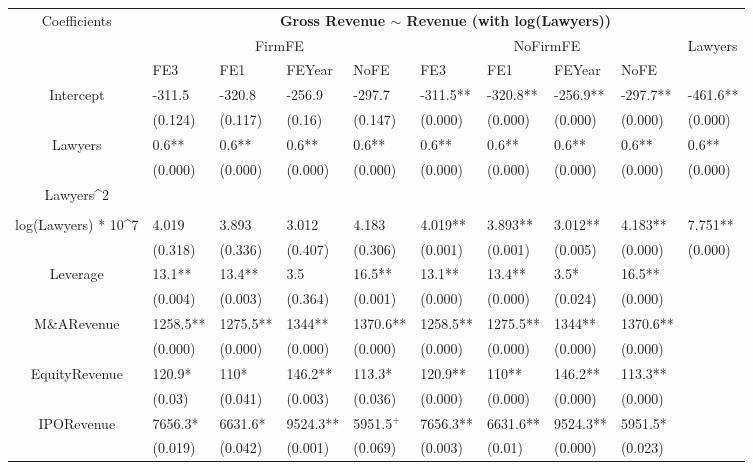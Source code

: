 \documentclass{article}
\begin{document}
\begin{table}[H]
\centering
\begin{tabular}{|clllllllll|}
\hline
\multirow{3}{*}{Coefficients} & \multicolumn{9}{c|}{\textbf{Gross Revenue $\sim$ Revenue (with log(Lawyers))}} \\
\cline{2-10}
& \multicolumn{4}{c}{FirmFE} & \multicolumn{4}{c}{NoFirmFE} & \multirow{2}{*}{Lawyers} \\
\cline{2-9}
& FE3 & FE1 & FEYear & NoFE & FE3 & FE1 & FEYear & NoFE &  \\
\hline
 
Intercept & -311.5 & -320.8 & -256.9 & -297.7 & -311.5** & -320.8** & -256.9** & -297.7** & -461.6** \\ 
   & (0.124) & (0.117) & (0.16) & (0.147) & (0.000) & (0.000) & (0.000) & (0.000) & (0.000) \\ 
  Lawyers & 0.6** & 0.6** & 0.6** & 0.6** & 0.6** & 0.6** & 0.6** & 0.6** & 0.6** \\ 
   & (0.000) & (0.000) & (0.000) & (0.000) & (0.000) & (0.000) & (0.000) & (0.000) & (0.000) \\ 
  Lawyers^2 &  &  &  &  &  &  &  &  &  \\ 
   &  &  &  &  &  &  &  &  &  \\ 
  log(Lawyers) * 10^7 & 4.019 & 3.893 & 3.012 & 4.183 & 4.019** & 3.893** & 3.012** & 4.183** & 7.751** \\ 
   & (0.318) & (0.336) & (0.407) & (0.306) & (0.001) & (0.001) & (0.005) & (0.000) & (0.000) \\ 
  Leverage & 13.1** & 13.4** & 3.5 & 16.5** & 13.1** & 13.4** & 3.5* & 16.5** &  \\ 
   & (0.004) & (0.003) & (0.364) & (0.001) & (0.000) & (0.000) & (0.024) & (0.000) &  \\ 
  M\&ARevenue & 1258.5** & 1275.5** & 1344** & 1370.6** & 1258.5** & 1275.5** & 1344** & 1370.6** &  \\ 
   & (0.000) & (0.000) & (0.000) & (0.000) & (0.000) & (0.000) & (0.000) & (0.000) &  \\ 
  EquityRevenue & 120.9* & 110* & 146.2** & 113.3* & 120.9** & 110** & 146.2** & 113.3** &  \\ 
   & (0.03) & (0.041) & (0.003) & (0.036) & (0.000) & (0.000) & (0.000) & (0.000) &  \\ 
  IPORevenue & 7656.3* & 6631.6* & 9524.3** & 5951.5$^{+}$ & 7656.3** & 6631.6** & 9524.3** & 5951.5* &  \\ 
   & (0.019) & (0.042) & (0.001) & (0.069) & (0.003) & (0.01) & (0.000) & (0.023) &  \\ 

\end{tabular}
\end{table}
\end{document}
